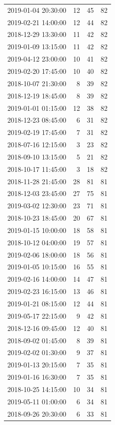 \begin{tabular}{lrrr}
2019-01-04 20:30:00 & 12 & 45 & 82 \\
2019-02-21 14:00:00 & 12 & 44 & 82 \\
2018-12-29 13:30:00 & 11 & 42 & 82 \\
2019-01-09 13:15:00 & 11 & 42 & 82 \\
2019-04-12 23:00:00 & 10 & 41 & 82 \\
2019-02-20 17:45:00 & 10 & 40 & 82 \\
2018-10-07 21:30:00 & 8 & 39 & 82 \\
2018-12-19 18:45:00 & 8 & 39 & 82 \\
2019-01-01 01:15:00 & 12 & 38 & 82 \\
2018-12-23 08:45:00 & 6 & 31 & 82 \\
2019-02-19 17:45:00 & 7 & 31 & 82 \\
2018-07-16 12:15:00 & 3 & 23 & 82 \\
2018-09-10 13:15:00 & 5 & 21 & 82 \\
2018-10-17 11:45:00 & 3 & 18 & 82 \\
2018-11-28 21:45:00 & 28 & 81 & 81 \\
2018-12-03 23:45:00 & 27 & 75 & 81 \\
2019-03-02 12:30:00 & 23 & 71 & 81 \\
2018-10-23 18:45:00 & 20 & 67 & 81 \\
2019-01-15 10:00:00 & 18 & 58 & 81 \\
2018-10-12 04:00:00 & 19 & 57 & 81 \\
2019-02-06 18:00:00 & 18 & 56 & 81 \\
2019-01-05 10:15:00 & 16 & 55 & 81 \\
2019-02-16 14:00:00 & 14 & 47 & 81 \\
2019-02-23 16:15:00 & 13 & 46 & 81 \\
2019-01-21 08:15:00 & 12 & 44 & 81 \\
2019-05-17 22:15:00 & 9 & 42 & 81 \\
2018-12-16 09:45:00 & 12 & 40 & 81 \\
2018-09-02 01:45:00 & 8 & 39 & 81 \\
2019-02-02 01:30:00 & 9 & 37 & 81 \\
2019-01-13 20:15:00 & 7 & 35 & 81 \\
2019-01-16 16:30:00 & 7 & 35 & 81 \\
2018-10-25 14:15:00 & 10 & 34 & 81 \\
2019-05-11 01:00:00 & 6 & 34 & 81 \\
2018-09-26 20:30:00 & 6 & 33 & 81 \\

\end{tabular}

